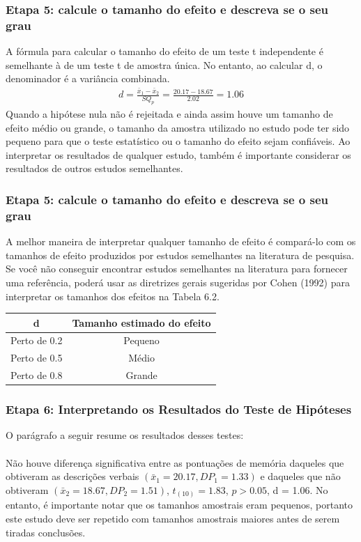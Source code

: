 \documentclass[11pt]{beamer}
\begin{document}
\begin{frame}
\frametitle{Etapa 5: calcule o tamanho do efeito e descreva se o seu grau}
A fórmula para calcular o tamanho do efeito de um teste t independente é semelhante à de um teste t de amostra única. No entanto, ao calcular d, o denominador é a variância combinada. 
\begin{align*}
d = \frac{\bar{x}_1 - \bar{x}_2}{SQ_p} = \frac{20.17-18.67}{2.02} = 1.06
\end{align*}
Quando a hipótese nula não é rejeitada e ainda assim houve um tamanho de efeito médio ou grande, o tamanho da amostra utilizado no estudo pode ter sido pequeno para que o teste estatístico ou o tamanho do efeito sejam confiáveis. Ao interpretar os resultados de qualquer estudo, também é importante considerar os resultados de outros estudos semelhantes.

\end{frame}

\begin{frame}
\frametitle{Etapa 5: calcule o tamanho do efeito e descreva se o seu grau}
A melhor maneira de interpretar qualquer tamanho de efeito é compará-lo com os tamanhos de efeito produzidos por estudos semelhantes na literatura de pesquisa. Se você não conseguir encontrar estudos semelhantes na literatura para fornecer uma referência, poderá usar as diretrizes gerais sugeridas por Cohen (1992) para interpretar os tamanhos dos efeitos na Tabela 6.2.

\begin{center}
\begin{tabular}{cc} 
 \hline
d  & Tamanho estimado do efeito\\
 \hline
Perto de 0.2 & Pequeno \\
Perto de 0.5 & Médio \\
Perto de 0.8 & Grande \\
 \hline
\end{tabular}
\end{center}   

\end{frame}

\begin{frame}
\frametitle{Etapa 6: Interpretando os Resultados do Teste de Hipóteses}

O parágrafo a seguir resume os resultados desses testes:\\~\\
Não houve diferença significativa entre as pontuações de memória daqueles que obtiveram as descrições verbais $(\bar{x}_1 = 20.17, DP_1 = 1.33)$ e daqueles que não obtiveram $(\bar{x}_2 = 18.67, DP_2 = 1.51)$, $t_{(10)} = 1.83$, $p > 0.05$, d = 1.06. No entanto, é importante notar que os tamanhos amostrais eram pequenos, portanto este estudo deve ser repetido com tamanhos amostrais maiores antes de serem tiradas conclusões.
\end{frame}
\end{document}
